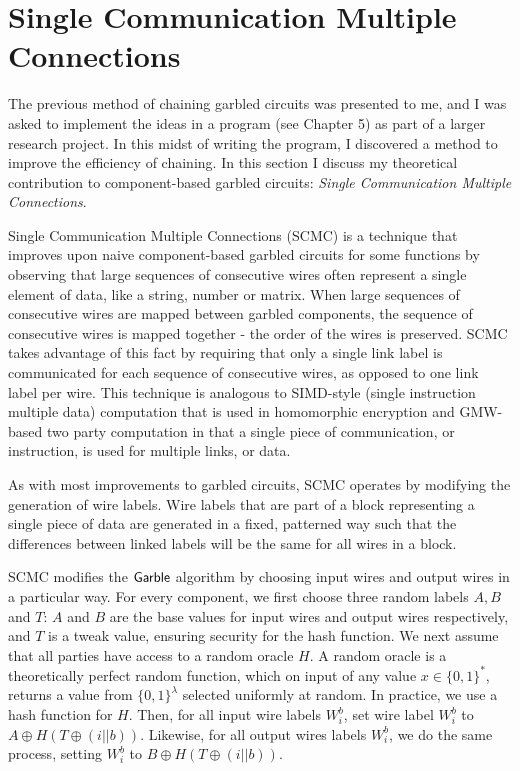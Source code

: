 \section{Single Communication Multiple Connections}

The previous method of chaining garbled circuits was presented to me, and I was asked to implement the ideas in a program (see Chapter 5) as part of a larger research project. 
In this midst of writing the program, I discovered a method to improve the efficiency of chaining. 
In this section I discuss my theoretical contribution to component-based garbled circuits:  \textit{Single Communication Multiple Connections}.

Single Communication Multiple Connections (SCMC) is a technique that improves upon naive component-based garbled circuits for some functions by observing that large sequences of consecutive wires often represent a single element of data, like a string, number or matrix. 
When large sequences of consecutive wires are mapped between garbled components, the sequence of consecutive wires is mapped together - the order of the wires is preserved. 
SCMC takes advantage of this fact by requiring that only a single link label is communicated for each sequence of consecutive wires, as opposed to one link label per wire. 
This technique is analogous to SIMD-style (single instruction multiple data) computation that is used in homomorphic encryption \cite{SV11} and GMW-based two party computation \cite{DSZ15, SZ15} in that a single piece of communication, or instruction, is used for multiple links, or data. 

As with most improvements to garbled circuits, SCMC operates by modifying the generation of wire labels. 
Wire labels that are part of a block representing a single piece of data are generated in a fixed, patterned way such that the differences between linked labels will be the same for all wires in a block. 

SCMC modifies the $\sf{Garble}$ algorithm by choosing input wires and output wires in a particular way. 
For every component, we first choose three random labels $A,B$ and $T$: $A$ and $B$ are the base values for input wires and output wires respectively, and $T$ is a tweak value, ensuring security for the hash function.
We next assume that all parties have access to a random oracle $H$. 
A random oracle is a theoretically perfect random function, which on input of any value $x \in \{0,1\}^*$, returns a value from $\{0,1\}^{\lambda}$ selected uniformly at random.
In practice, we use a hash function for $H$. 
Then, for all input wire labels $W_i^b$, set wire label $W_i^b$ to $A \oplus H(T \oplus (i || b))$. 
Likewise, for all output wires labels $W_i^b$, we do the same process, setting $W_i^b$ to $B \oplus H(T \oplus (i || b))$.

